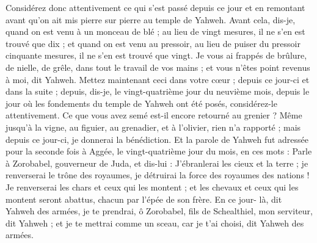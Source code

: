 \begin{multicols}{2}
Considérez donc attentivement ce qui s'est passé depuis ce jour et en remontant avant qu'on ait mis pierre sur pierre au temple de Yahweh.
Avant cela, dis-je, quand on est venu à un monceau de blé ; au lieu de vingt mesures, il ne s'en est trouvé que dix ; et quand on est venu au pressoir, au lieu de puiser du pressoir cinquante mesures, il ne s'en est trouvé que vingt.
Je vous ai frappés de brûlure, de nielle, de grêle, dans tout le travail de vos mains ; et vous n'êtes point revenus à moi, dit Yahweh.
Mettez maintenant ceci dans votre cœur ; depuis ce jour-ci et dans la suite ; depuis, dis-je, le vingt-quatrième jour du neuvième mois, depuis le jour où les fondements du temple de Yahweh ont été posés, considérez-le attentivement.
Ce que vous avez semé est-il encore retourné au grenier ? Même jusqu'à la vigne, au figuier, au grenadier, et à l'olivier, rien n'a rapporté ; mais depuis ce jour-ci, je donnerai la bénédiction.
Et la parole de Yahweh fut adressée pour la seconde fois à Aggée, le vingt-quatrième jour du mois, en ces mots :
Parle à Zorobabel, gouverneur de Juda, et dis-lui : J'ébranlerai les cieux et la terre ;
je renverserai le trône des royaumes, je détruirai la force des royaumes des nations ! Je renverserai les chars et ceux qui les montent ; et les chevaux et ceux qui les montent seront abattus, chacun par l'épée de son frère.
En ce jour- là, dit Yahweh des armées, je te prendrai, ô Zorobabel, fils de Schealthiel, mon serviteur, dit Yahweh ; et je te mettrai comme un sceau, car je t'ai choisi, dit Yahweh des armées.
\PPE{}
\end{multicols}
